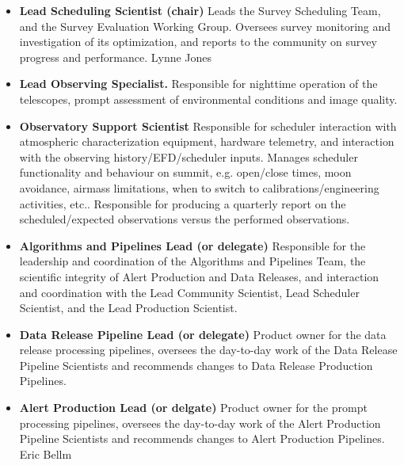 \documentclass[OPS,authoryear,toc]{lsstdoc}
\begin{document}
\begin{itemize}
\item {
{\bf Lead Scheduling Scientist (chair)}
Leads the Survey Scheduling Team, and the Survey Evaluation Working Group. Oversees survey monitoring and investigation of its optimization, and reports to the community on survey progress and performance. 
 Lynne Jones
}
\item{
{\bf Lead Observing Specialist.}
 Responsible for nighttime operation of the telescopes,   prompt assessment of environmental conditions and image quality.  
}
\item{
{\bf Observatory Support Scientist}
 Responsible for scheduler interaction with atmospheric characterization equipment, hardware telemetry, and interaction with the observing history/EFD/scheduler inputs. Manages scheduler functionality and behaviour on summit, e.g. open/close times, moon avoidance, airmass limitations, when to switch to calibrations/engineering activities, etc.. Responsible for producing a quarterly report on the scheduled/expected observations versus the performed observations.  
}
\item{
{\bf Algorithms and Pipelines Lead (or delegate)}
 Responsible for the leadership and coordination of the Algorithms and Pipelines Team, the scientific integrity of Alert Production and Data Releases, and interaction and coordination with the Lead Community Scientist, Lead Scheduler Scientist, and the Lead Production Scientist. 
}
\item{
{\bf Data Release Pipeline Lead (or delegate)}
 Product owner for the data release processing pipelines,  oversees the day-to-day work of the Data Release Pipeline Scientists and recommends changes to Data Release Production Pipelines.
}
\item{
{\bf Alert Production Lead (or delgate)}
 Product owner for the  prompt processing pipelines, oversees the day-to-day work of the Alert Production Pipeline Scientists and recommends changes to Alert Production Pipelines.
 Eric Bellm
}
\end{itemize}
\end{document}
